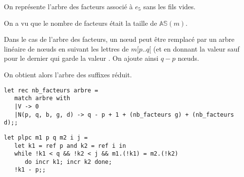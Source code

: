 \begin{Exercise}
\begin{enumerate}
    On représente l'arbre des facteurs associé à $e_5$ sans les fils vides.
    
\begin{center}
\end{center}
\end{enumerate}
\end{Exercise} 
\begin{Exercise}
On a vu que le nombre de facteurs était la taille de $\mathbb{AS}(m)$.

Dans le cas de l'arbre des facteurs, un nœud  peut être remplacé par un arbre linéaire de nœuds en suivant les lettres de $m[p..q[$ (et en donnant la valeur  sauf pour le dernier qui garde la valeur . On ajoute ainsi $q-p$ nœuds. 

On obtient alors l'arbre des suffixes réduit.
\begin{lstlisting}
let rec nb_facteurs arbre =
   match arbre with
   |V -> 0
   |N(p, q, b, g, d) -> q - p + 1 + (nb_facteurs g) + (nb_facteurs d);;
\end{lstlisting}
\end{Exercise} 
\begin{Exercise}
\begin{lstlisting}
let plpc m1 p q m2 i j =
   let k1 = ref p and k2 = ref i in
   while !k1 < q && !k2 < j && m1.(!k1) = m2.(!k2) 
      do incr k1; incr k2 done;
   !k1 - p;;
\end{lstlisting}
\end{Exercise} 
